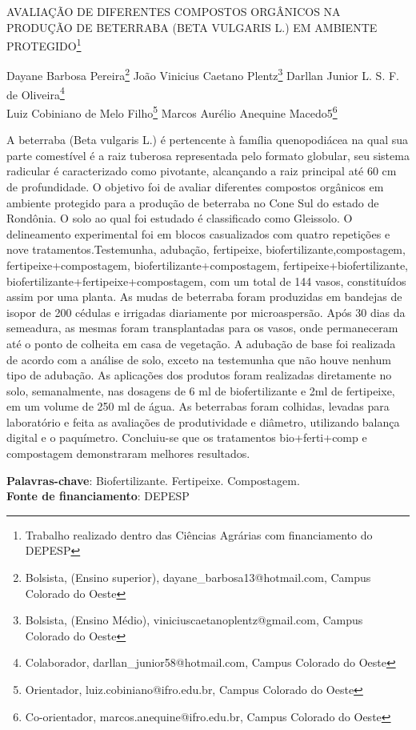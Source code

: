 \documentclass[article,12pt,onesidea,4paper,english,brazil]{abntex2}
\begin{document}
	
	
	\frenchspacing 
	
	\begin{center}
		\LARGE AVALIAÇÃO DE DIFERENTES COMPOSTOS ORGÂNICOS NA PRODUÇÃO
		DE BETERRABA (BETA VULGARIS L.) EM AMBIENTE PROTEGIDO\footnote{Trabalho realizado dentro das Ciências Agrárias com financiamento do DEPESP}
		
		\normalsize
		Dayane Barbosa Pereira\footnote{Bolsista, (Ensino superior), dayane\_barbosa13@hotmail.com, Campus Colorado do Oeste} 
		João Vinicius Caetano Plentz\footnote{Bolsista, (Ensino Médio), viniciuscaetanoplentz@gmail.com, Campus Colorado do Oeste} 
	Darllan Junior L. S. F. de Oliveira\footnote{Colaborador, darllan\_junior58@hotmail.com, Campus Colorado do Oeste} \\
		Luiz Cobiniano de Melo Filho\footnote{Orientador, luiz.cobiniano@ifro.edu.br, Campus Colorado do Oeste}
		Marcos Aurélio Anequine Macedo5\footnote{Co-orientador, marcos.anequine@ifro.edu.br, Campus Colorado do Oeste} 
	\end{center}
	
	\noindent A beterraba (Beta vulgaris L.) é pertencente à família quenopodiácea na qual sua
	parte comestível é a raiz tuberosa representada pelo formato globular, seu sistema
	radicular é caracterizado como pivotante, alcançando a raiz principal até 60 cm de
	profundidade. O objetivo foi de avaliar diferentes compostos orgânicos em
	ambiente protegido para a produção de beterraba no Cone Sul do estado de
	Rondônia. O solo ao qual foi estudado é classificado como Gleissolo. O
	delineamento experimental foi em blocos casualizados com quatro repetições e
	nove tratamentos.Testemunha, adubação, fertipeixe, biofertilizante,compostagem,
	fertipeixe+compostagem, biofertilizante+compostagem, fertipeixe+biofertilizante,
	biofertilizante+fertipeixe+compostagem, com um total de 144 vasos, constituídos
	assim por uma planta. As mudas de beterraba foram produzidas em bandejas de
	isopor de 200 cédulas e irrigadas diariamente por microaspersão. Após 30 dias da
	semeadura, as mesmas foram transplantadas para os vasos, onde permaneceram
	até o ponto de colheita em casa de vegetação. A adubação de base foi realizada
	de acordo com a análise de solo, exceto na testemunha que não houve nenhum
	tipo de adubação. As aplicações dos produtos foram realizadas diretamente no
	solo, semanalmente, nas dosagens de 6 ml de biofertilizante e 2ml de fertipeixe,
	em um volume de 250 ml de água. As beterrabas foram colhidas, levadas para
	laboratório e feita as avaliações de produtividade e diâmetro, utilizando balança
	digital e o paquímetro. Concluiu-se que os tratamentos bio+ferti+comp e
	compostagem demonstraram melhores resultados.
	
	\vspace{\onelineskip}
	
	\noindent
	\textbf{Palavras-chave}: Biofertilizante. Fertipeixe. Compostagem. \\
	\textbf{Fonte de financiamento}: DEPESP
	
\end{document}

